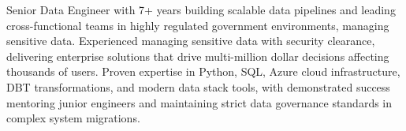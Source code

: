 
\begin{cvparagraph}
Senior Data Engineer with 7+ years building scalable data pipelines and leading cross-functional teams in highly regulated government environments, managing sensitive data. Experienced managing sensitive data with security clearance, delivering enterprise solutions that drive multi-million dollar decisions affecting thousands of users. Proven expertise in Python, SQL, Azure cloud infrastructure, DBT transformations, and modern data stack tools, with demonstrated success mentoring junior engineers and maintaining strict data governance standards in complex system migrations.
\end{cvparagraph}
